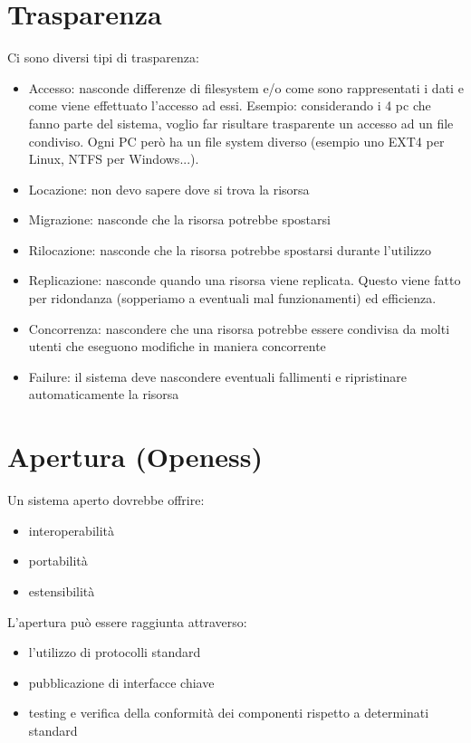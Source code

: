 \section{Trasparenza}
Ci sono diversi tipi di trasparenza: 
\begin{itemize}
    \item Accesso: nasconde differenze di filesystem e/o come sono rappresentati i dati e come viene effettuato l'accesso ad essi. Esempio: considerando i 4 pc che fanno parte del sistema, voglio far risultare trasparente un accesso ad un file condiviso. Ogni PC però ha un file system diverso (esempio uno EXT4 per Linux, NTFS per Windows...).
    \item Locazione: non devo sapere dove si trova la risorsa
    \item Migrazione: nasconde che la risorsa potrebbe spostarsi
    \item Rilocazione: nasconde che la risorsa potrebbe spostarsi durante l'utilizzo
    \item Replicazione: nasconde quando una risorsa viene replicata. Questo viene fatto per ridondanza (sopperiamo a eventuali mal funzionamenti) ed efficienza. 
    \item Concorrenza: nascondere che una risorsa potrebbe essere condivisa da molti utenti che eseguono modifiche in maniera concorrente
    \item Failure: il sistema deve nascondere eventuali fallimenti e ripristinare automaticamente la risorsa 
\end{itemize}

\section{Apertura (Openess)}
Un sistema aperto dovrebbe offrire:
\begin{itemize}
    \item interoperabilità
    \item portabilità
    \item estensibilità
\end{itemize}

L'apertura può essere raggiunta attraverso:
\begin{itemize}
    \item l'utilizzo di protocolli standard
    \item pubblicazione di interfacce chiave
    \item testing e verifica della conformità dei componenti rispetto a determinati standard
\end{itemize}

